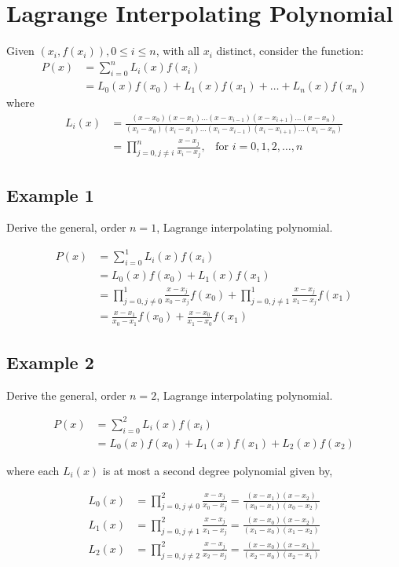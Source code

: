 \documentclass [titlepage,12pt,letter] {article}
\begin{document}
\section{Lagrange Interpolating Polynomial} 

Given ${(x_i,f(x_i))}, 0 \leq i \leq n$, with all $x_i$ distinct, consider the function: 
\begin{align*}
P(x) &= \sum_{i=0}^{n} L_i(x) f(x_i) \\
     &= L_0(x) f(x_0) + L_1(x)f(x_1) + \dots + L_n(x)f(x_n)
\end{align*} 
\noindent 
where 
\begin{align*}
L_i(x) &= \frac{(x-x_0)(x-x_1)\dots(x-x_{i-1})(x-x_{i+1})\dots(x-x_n)}{(x_i-x_0)(x_i-x_1)\dots(x_i-x_{i-1})(x_i-x_{i+1})\dots(x_i-x_n)} \\
   &= \prod_{j=0,j \neq i}^{n} \frac{x-x_j}{x_i-x_j}, \;\;\; \mbox{for } i=0,1,2,\dots,n 
\end{align*}

\subsection{Example 1}

Derive the general, order $n=1$, Lagrange interpolating polynomial.

\begin{align*}
P(x) &= \sum_{i=0}^{1} L_i(x) f(x_i) \\
     &= L_0(x) f(x_0) + L_1(x)f(x_1) \\
     &= \prod_{j=0,j \neq 0}^{1} \frac{x-x_j}{x_0-x_j} f(x_0) + \prod_{j=0,j \neq 1}^{1} \frac{x-x_j}{x_1-x_j} f(x_1) \\
     &= \frac{x-x_1}{x_0-x_1} f(x_0) + \frac{x-x_0}{x_1-x_0} f(x_1)
\end{align*}

\subsection{Example 2}
Derive the general, order $n=2$, Lagrange interpolating polynomial.

\begin{align*}
P(x) &= \sum_{i=0}^{2} L_i(x) f(x_i) \\
     &= L_0(x) f(x_0) + L_1(x)f(x_1) + L_2(x)f(x_2)
\end{align*}

\noindent
where each $L_i(x)$ is at most a second degree polynomial given by,

\begin{align*}
   L_0(x) &= \prod_{j=0,j \neq 0}^{2} \frac{x-x_j}{x_0-x_j} = \frac{(x-x_1)(x-x_2)}{(x_0-x_1)(x_0-x_2)} \\
   L_1(x) &= \prod_{j=0,j \neq 1}^{2} \frac{x-x_j}{x_1-x_j} = \frac{(x-x_0)(x-x_2)}{(x_1-x_0)(x_1-x_2)} \\ 
   L_2(x) &= \prod_{j=0,j \neq 2}^{2} \frac{x-x_j}{x_2-x_j} = \frac{(x-x_0)(x-x_1)}{(x_2-x_0)(x_2-x_1)} \\
\end{align*}
\end{document}
